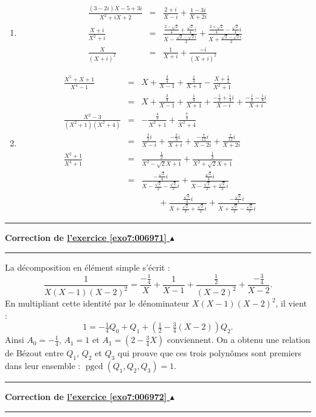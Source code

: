 \documentclass[11pt,a4paper]{article}
\newcommand{\pgcd}{\mathop{\mathrm{pgcd}}\nolimits}
\newcounter{exo}
\newcommand{\correction}[1]{\hypertarget{cor7:#1}{}\label{cor7:#1}{\bf Correction de \hyperlink{exo7:#1}{l'exercice \ref{exo7:#1} $\blacktriangle$}}\vspace{1mm}\hrule\vspace{1mm}}
\newcommand{\fincorrection}{\vspace{1mm}\hrule\vspace*{7mm}}
\begin{document}
\begin{enumerate}
\item 
$$\begin{array}{rcl}
\frac{(3-2 i )X-5+3 i}{X^2+ i  X+2} &=&\frac{2+ i}{X- i}+\frac{1-3 i}{X+2 i}\\
\frac{X+ i }{X^2+ i} &=&\frac{\frac{2-\sqrt2}{4}+\frac{\sqrt2}{4} i}{X-\frac{\sqrt2-\sqrt2 i }{2}} +
\frac{\frac{2+\sqrt2}{4}-\frac{\sqrt2}{4} i }{X+\frac{\sqrt2-\sqrt2 i}{2}}\\
\frac{X}{(X+ i)^2} &=&\frac{1}{X+ i}+\frac{-i}{(X+ i)^2}
\end{array}$$

\item 
$$\begin{array}{rcl}
\frac{X^5+X+1}{X^4-1} 
& =& X + \frac{\frac34}{X-1} + \frac{\frac14}{X+1} - \frac{X+\frac{1}{2}}{X^2+1} \\
 &=& X + \frac{\frac34}{X-1} + \frac{\frac14}{X+1} + 
\frac{-\frac{1}{2}+\frac{1}{4} i }{X- i } + 
\frac{-\frac{1}{2}-\frac{1}{4} i }{X+ i }\\
\frac{X^2-3}{(X^2+1)(X^2+4)} 
&=& -\frac{\frac43}{X^2+1} + \frac{\frac73}{X^2+4} \\
 & =& \frac{\frac{2}{3} i }{X- i } + \frac{-\frac{2}{3} i }{X+ i } + 
\frac{-\frac{7}{12} i }{X-2 i } + \frac{\frac{7}{12} i }{X+2 i }\\
\frac{X^2+1}{X^4+1} 
&=&\frac{\frac12}{X^2-\sqrt{2}X+1}+\frac{\frac12}{X^2+\sqrt{2}X+1}\\
& =&\frac{-\frac{\sqrt{2}}{4} i }{X-\frac{\sqrt{2}}{2}-\frac{\sqrt{2}}{2} i } + 
\frac{ \frac{\sqrt{2}}{4} i }{X-\frac{\sqrt{2}}{2}+\frac{\sqrt{2}}{2} i } \\
 & &\ \ \ \ \ \  \ \ \ + 
\frac{ \frac{\sqrt{2}}{4} i }{X+\frac{\sqrt{2}}{2}+\frac{\sqrt{2}}{2} i } + 
\frac{-\frac{\sqrt{2}}{4} i }{X+\frac{\sqrt{2}}{2}-\frac{\sqrt{2}}{2} i }
\end{array}$$

\end{enumerate}
\fincorrection
\correction{006971}
La décomposition en élément simple s'écrit :
$$\frac{1}{X(X-1)(X-2)^2}=\frac{-\frac14}{X}+\frac{1}{X-1}+\frac{\frac12}{(X-2)^2}+\frac{-\frac34}{X-2}.$$ 
En multipliant cette identité par le dénominateur $X(X-1)(X-2)^2$, il vient :
$$1 =-\tfrac{1}{4}Q_0+Q_1+\left(\tfrac{1}{2}-\tfrac{3}{4}(X-2)\right)Q_2.$$
Ainsi $A_0=-\frac{1}{4}$, $A_1=1$ et $A_1=(2-\frac{3}{4}X)$ conviennent. 
On a obtenu une relation de Bézout entre $Q_1$, $Q_2$ et $Q_3$ qui prouve que 
ces trois polynômes sont premiers dans leur ensemble : $\pgcd(Q_1,Q_2,Q_3)=1$.
\fincorrection
\correction{006972}
\end{document}
